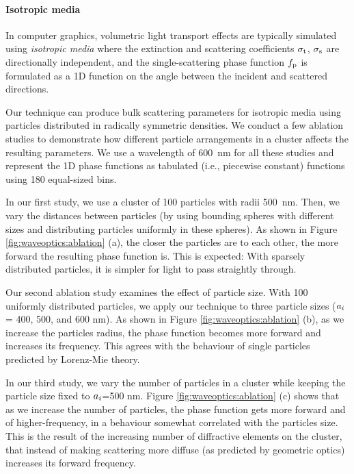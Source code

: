 

\paragraph{Isotropic media}

In computer graphics, volumetric light transport effects are typically simulated using \emph{isotropic media} where the extinction and scattering coefficients $\sigma_\mathrm{t}$, $\sigma_\mathrm{s}$ are directionally independent, and the single-scattering phase function $f_\mathrm{p}$ is formulated as a 1D function on the angle between the incident and scattered directions.

Our technique can produce bulk scattering parameters for isotropic media using particles distributed in radically symmetric densities.
We conduct a few ablation studies to demonstrate how different particle arrangements in a cluster affects the resulting parameters.
We use a wavelength of 600~nm for all these studies and represent the 1D phase functions as tabulated (i.e., piecewise constant) functions using 180 equal-sized bins.





In our first study, we use a cluster of 100 particles with radii 500~nm. Then, we vary the distances between particles (by using bounding spheres with different sizes and distributing particles uniformly in these spheres).
As shown in Figure \ref{fig:waveoptics:ablation} (a), the closer the particles are to each other, the more forward the resulting phase function is.
This is expected: With sparsely distributed particles, it is simpler for light to pass straightly through.

Our second ablation study examines the effect of particle size. With 100 uniformly distributed particles, we apply our technique to three particle sizes ($a_i$= 400, 500, and 600 nm).
As shown in Figure \ref{fig:waveoptics:ablation} (b), as we increase the particles radius, the phase function becomes more forward and increases its frequency. This agrees with the behaviour of single particles predicted by Lorenz-Mie theory. 

In our third study, we vary the number of particles in a cluster while keeping the particle size fixed to $a_i$=500 nm.
Figure \ref{fig:waveoptics:ablation} (c) shows that as we increase the number of particles, the phase function gets more forward and of higher-frequency, in a behaviour somewhat correlated with the particles size. This is the result of the increasing number of diffractive elements on the cluster, that instead of making scattering more diffuse (as predicted by geometric optics) increases its forward frequency. 

